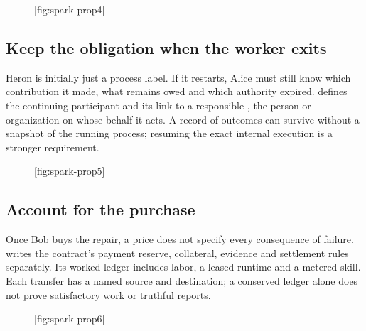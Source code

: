 \begin{figure}[tp]
  \centering
  [fig:spark-prop4]
\end{figure}

\subsection{Keep the obligation when the worker exits}
Heron is initially just a process label. If it restarts, Alice must still know
which contribution it made, what remains owed and which authority expired.
 defines the continuing participant and its link to a responsible
, the person or organization on whose behalf it acts. A record
of outcomes can survive without a snapshot of the running process; resuming
the exact internal execution is a stronger requirement.

\begin{figure}[tp]
  \centering
  [fig:spark-prop5]
\end{figure}

\subsection{Account for the purchase}
Once Bob buys the repair, a price does not specify every consequence of
failure.  writes the contract's payment reserve, collateral, evidence
and settlement rules separately. Its worked ledger includes labor, a leased
runtime and a metered skill. Each transfer has a named source and destination;
a conserved ledger alone does not prove satisfactory work or truthful reports.

\begin{figure}[tp]
  \centering
  [fig:spark-prop6]
\end{figure}

